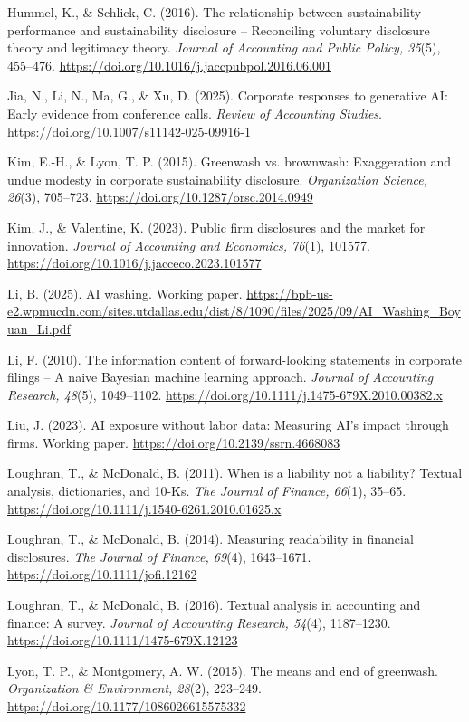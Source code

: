 Hummel, K., \& Schlick, C. (2016). The relationship between sustainability performance and sustainability disclosure -- Reconciling voluntary disclosure theory and legitimacy theory. \textit{Journal of Accounting and Public Policy, 35}(5), 455--476. \url{https://doi.org/10.1016/j.jaccpubpol.2016.06.001}

Jia, N., Li, N., Ma, G., \& Xu, D. (2025). Corporate responses to generative AI: Early evidence from conference calls. \textit{Review of Accounting Studies}. \url{https://doi.org/10.1007/s11142-025-09916-1}

Kim, E.-H., \& Lyon, T. P. (2015). Greenwash vs. brownwash: Exaggeration and undue modesty in corporate sustainability disclosure. \textit{Organization Science, 26}(3), 705--723. \url{https://doi.org/10.1287/orsc.2014.0949}

Kim, J., \& Valentine, K. (2023). Public firm disclosures and the market for innovation. \textit{Journal of Accounting and Economics, 76}(1), 101577. \url{https://doi.org/10.1016/j.jacceco.2023.101577}

Li, B. (2025). AI washing. Working paper. \url{https://bpb-us-e2.wpmucdn.com/sites.utdallas.edu/dist/8/1090/files/2025/09/AI_Washing_Boyuan_Li.pdf}

Li, F. (2010). The information content of forward-looking statements in corporate filings -- A naive Bayesian machine learning approach. \textit{Journal of Accounting Research, 48}(5), 1049--1102. \url{https://doi.org/10.1111/j.1475-679X.2010.00382.x}

Liu, J. (2023). AI exposure without labor data: Measuring AI's impact through firms. Working paper. \url{https://doi.org/10.2139/ssrn.4668083}

Loughran, T., \& McDonald, B. (2011). When is a liability not a liability? Textual analysis, dictionaries, and 10-Ks. \textit{The Journal of Finance, 66}(1), 35--65. \url{https://doi.org/10.1111/j.1540-6261.2010.01625.x}

Loughran, T., \& McDonald, B. (2014). Measuring readability in financial disclosures. \textit{The Journal of Finance, 69}(4), 1643--1671. \url{https://doi.org/10.1111/jofi.12162}

Loughran, T., \& McDonald, B. (2016). Textual analysis in accounting and finance: A survey. \textit{Journal of Accounting Research, 54}(4), 1187--1230. \url{https://doi.org/10.1111/1475-679X.12123}

Lyon, T. P., \& Montgomery, A. W. (2015). The means and end of greenwash. \textit{Organization \& Environment, 28}(2), 223--249. \url{https://doi.org/10.1177/1086026615575332}

